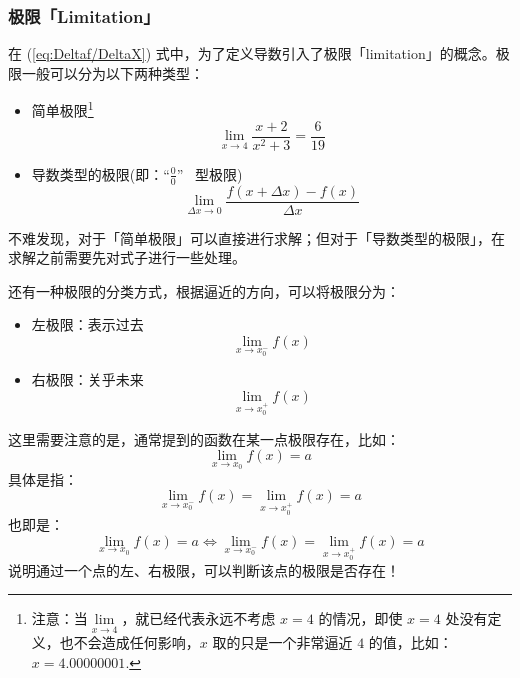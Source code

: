 \documentclass{ctexart}
\numberwithin{equation}{section}
\numberwithin{figure}{section}
\begin{document}
\subsubsection{极限「Limitation」}
在 (\ref{eq:Deltaf/DeltaX}) 式中，为了定义导数引入了极限「limitation」的概念。极限一般可以分为以下两种类型：
\begin{itemize}
    \item 简单极限\footnote{注意：当\(\lim\limits_{x \to 4}\)，就已经代表永远不考虑 \(x=4\) 的情况，即使 \(x=4\) 处没有定义，也不会造成任何影响，\(x\) 取的只是一个非常逼近 \(4\) 的值，比如：\(x=4.00000001\).}
          \begin{equation*}
              \lim_{x \to 4} \frac{x + 2}{x^2 + 3} = \frac{6}{19}
          \end{equation*}
    \item 导数类型的极限(即：“\(\frac{0}{0}\)” \  型极限)
          \begin{equation*}
              \lim_{\Delta x \to 0} \frac{f(x + \Delta x) - f(x)}{\Delta x}
          \end{equation*}
\end{itemize}
不难发现，对于「简单极限」可以直接进行求解；但对于「导数类型的极限」，在求解之前需要先对式子进行一些处理。

还有一种极限的分类方式，根据逼近的方向，可以将极限分为：
\begin{itemize}
    \item 左极限：表示过去
          \begin{equation*}
              \lim\limits_{x \to x_0^{-}}f(x)
          \end{equation*}
    \item 右极限：关乎未来
          \begin{equation*}
              \lim\limits_{x \to x_0^{+}}f(x)
          \end{equation*}
\end{itemize}
这里需要注意的是，通常提到的函数在某一点极限存在，比如：
\begin{equation*}
    \lim\limits_{x \to x_0}f(x) = a
\end{equation*}
具体是指：
\begin{equation*}
    \lim\limits_{x \to x_0^{-}}f(x) = \lim\limits_{x \to x_0^{+}}f(x) = a
\end{equation*}
也即是：
\begin{equation*}
    \lim\limits_{x \to x_0}f(x) = a \Leftrightarrow
    \lim\limits_{x \to x_0^{-}}f(x) = \lim\limits_{x \to x_0^{+}}f(x) = a
\end{equation*}
说明通过一个点的左、右极限，可以判断该点的极限是否存在！
\end{document}
